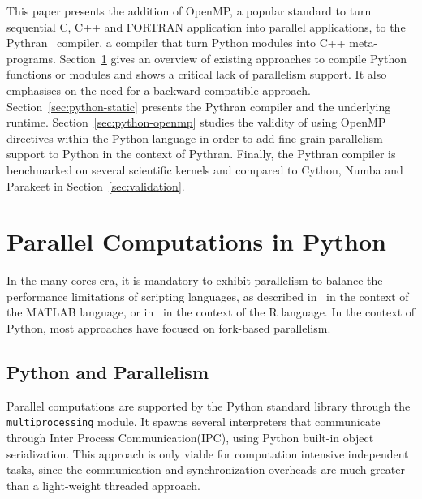 \documentclass[conference]{IEEEtran}
\begin{document}
This paper presents the addition of OpenMP, a popular standard to turn
sequential C, C++ and FORTRAN application into parallel applications, to the
Pythran~\cite{pythran2013} compiler, a compiler that turn Python modules into
C++ meta-programs.  Section~\ref{sec:python-parallel} gives an overview of
existing approaches to compile Python functions or modules and shows a critical
lack of parallelism support. It also emphasises on the need for a
backward-compatible approach. Section~\ref{sec:python-static} presents the
Pythran compiler and the underlying runtime. Section~\ref{sec:python-openmp}
studies the validity of using OpenMP directives within the Python language in
order to add fine-grain parallelism support to Python in the context of Pythran.
Finally, the Pythran compiler is benchmarked on several scientific kernels and
compared to Cython, Numba and Parakeet in Section~\ref{sec:validation}.

\section{Parallel Computations in Python}\label{sec:python-parallel}

In the many-cores era, it is mandatory to exhibit parallelism to balance the 
performance limitations of scripting languages, as described in~\cite{choy05}
in the context of the MATLAB language, or in~\cite{mals07} in the context of 
the R language. In the context of Python, most approaches have focused on
fork-based parallelism.

\subsection{Python and Parallelism}

Parallel computations are supported by the Python standard library through the
\texttt{multiprocessing} module. It spawns several interpreters that
communicate through Inter Process Communication(IPC), using Python built-in
object serialization. This approach is only viable for computation intensive
independent tasks, since the communication and synchronization overheads are 
much greater than a light-weight threaded approach.
\end{document}
